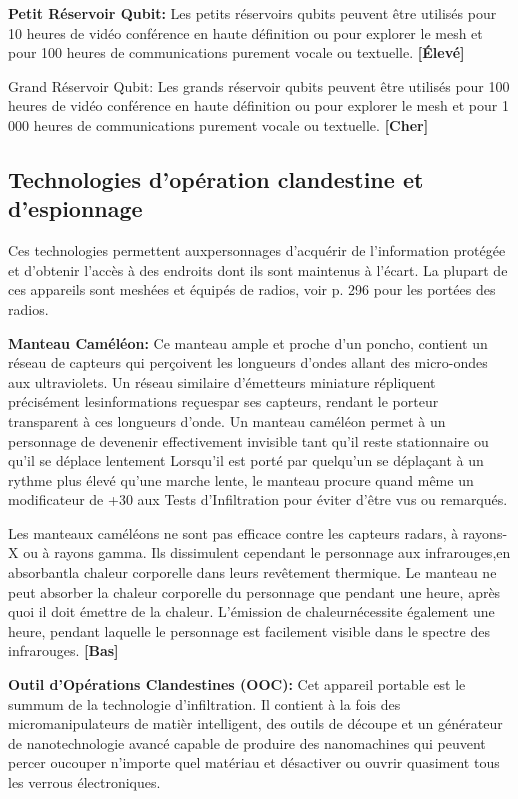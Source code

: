 \textbf{Petit Réservoir Qubit:} Les petits réservoirs qubits peuvent être utilisés pour 10 heures de vidéo conférence en haute définition ou pour explorer le mesh et pour 100 heures de communications purement vocale ou textuelle. \textbf{[Élevé]} 

Grand Réservoir Qubit: Les grands réservoir qubits peuvent être utilisés pour 100 heures de vidéo conférence en haute définition ou pour explorer le mesh et pour 1 000 heures de communications purement vocale ou textuelle. \textbf{[Cher]} 



\subsection{Technologies d'opération clandestine et d'espionnage} \label{sec:covert-espionage-tech} 

Ces technologies permettent auxpersonnages d'acquérir de l'information protégée et d'obtenir l'accès à des endroits dont ils sont maintenus à l'écart. La plupart de ces appareils sont meshées et équipés de radios, voir p. 296 pour les portées des radios. 

\textbf{Manteau Caméléon:} Ce manteau ample et proche d'un poncho, contient un réseau de capteurs qui perçoivent les longueurs d'ondes allant des micro-ondes aux ultraviolets. Un réseau similaire d'émetteurs miniature répliquent précisément lesinformations reçuespar ses capteurs, rendant le porteur transparent à ces longueurs d'onde. Un manteau caméléon permet à un personnage de devenenir effectivement invisible tant qu'il reste stationnaire ou qu'il se déplace lentement Lorsqu'il est porté par quelqu'un se déplaçant à un rythme plus élevé qu'une marche lente, le manteau procure quand même un modificateur de +30 aux Tests d'Infiltration pour éviter d'être vus ou remarqués. 

Les manteaux caméléons ne sont pas efficace contre les capteurs radars, à rayons-X ou à rayons gamma. Ils dissimulent cependant le personnage aux infrarouges,en absorbantla chaleur corporelle dans leurs revêtement thermique. Le manteau ne peut absorber la chaleur corporelle du personnage que pendant une heure, après quoi il doit émettre de la chaleur. L'émission de chaleurnécessite également une heure, pendant laquelle le personnage est facilement visible dans le spectre des infrarouges. \textbf{[Bas]} 

\textbf{Outil d'Opérations Clandestines (OOC):} Cet appareil portable est le summum de la technologie d'infiltration. Il contient à la fois des micromanipulateurs de matièr intelligent, des outils de découpe et un générateur de nanotechnologie avancé capable de produire des nanomachines qui peuvent percer oucouper n'importe quel matériau et désactiver ou ouvrir quasiment tous les verrous électroniques. 

